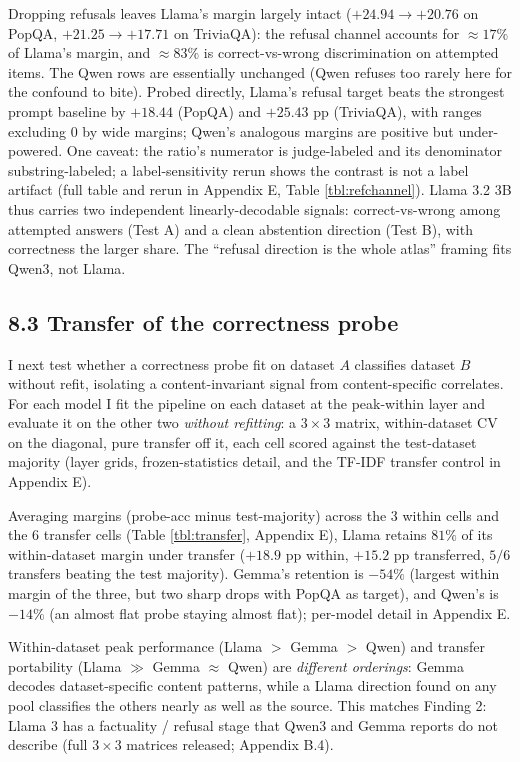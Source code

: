 Dropping refusals leaves Llama's margin largely
intact (\(+24.94 \to +20.76\) on PopQA, \(+21.25 \to +17.71\) on
TriviaQA): the refusal channel accounts for \(\approx 17\%\) of Llama's margin, and \(\approx 83\%\) is correct-vs-wrong discrimination on attempted items. The Qwen rows are essentially unchanged (Qwen refuses too rarely here for the confound to bite).
Probed directly, Llama's refusal target beats the strongest prompt
baseline by \(+18.44\) (PopQA) and \(+25.43\) pp (TriviaQA), with ranges
excluding \(0\) by wide margins; Qwen's analogous margins are positive
but under-powered. One caveat: the ratio's numerator is judge-labeled
and its denominator substring-labeled; a label-sensitivity rerun shows the contrast is not a label artifact (full table and rerun in Appendix E, Table \ref{tbl:refchannel}).
Llama 3.2 3B thus carries two independent linearly-decodable signals:
correct-vs-wrong among attempted answers (Test A) and a clean abstention
direction (Test B), with correctness the larger share. The ``refusal
direction is the whole atlas'' framing fits Qwen3, not Llama.

\subsection{8.3 Transfer of the correctness
probe}\label{transfer-of-the-correctness-probe}

I next test whether a correctness probe fit on dataset \(A\) classifies dataset \(B\) without refit, isolating a content-invariant signal from content-specific correlates. For each
model I fit the pipeline on each dataset at the peak-within layer and
evaluate it on the other two \emph{without refitting}: a \(3 \times 3\)
matrix, within-dataset CV on the diagonal, pure transfer off it, each
cell scored against the test-dataset majority (layer grids,
frozen-statistics detail, and the TF-IDF transfer control in Appendix
E).

Averaging margins (probe-acc minus test-majority) across the 3 within cells and the 6 transfer cells (Table \ref{tbl:transfer}, Appendix E), Llama retains \(81\%\) of its
within-dataset margin under transfer (\(+18.9\) pp within, \(+15.2\) pp
transferred, \(5/6\) transfers beating the test majority). Gemma's
retention is \(-54\%\) (largest within margin of the three, but two sharp drops with PopQA as target), and Qwen's is \(-14\%\)
(an almost flat probe staying almost flat); per-model detail in Appendix
E.

Within-dataset peak performance (Llama \(>\) Gemma
\(>\) Qwen) and transfer portability (Llama \(\gg\) Gemma \(\approx\)
Qwen) are \emph{different orderings}: Gemma decodes dataset-specific
content patterns, while a Llama direction found on any pool classifies
the others nearly as well as the source. This matches Finding 2: Llama 3 has a factuality / refusal stage
that Qwen3 and Gemma reports do not describe (full \(3 \times 3\) matrices
released; Appendix B.4).

